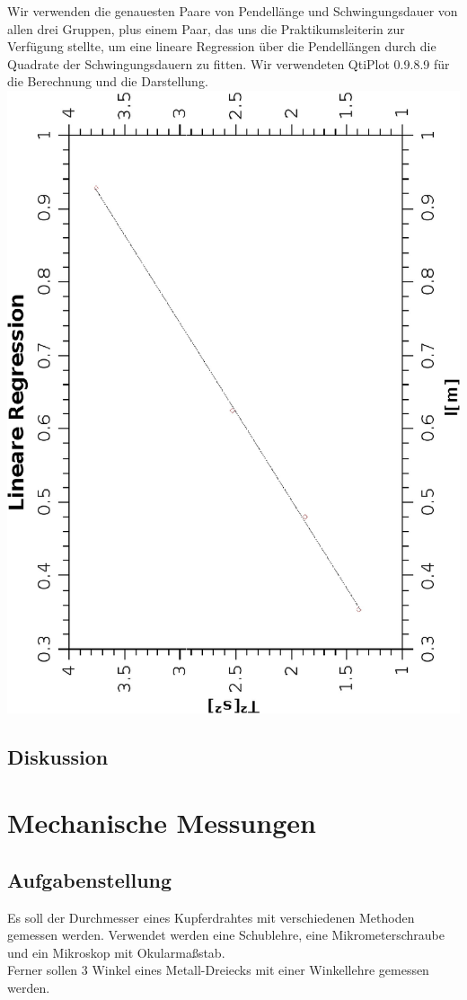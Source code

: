 \documentclass{article}
\begin{document}
Wir verwenden die genauesten Paare von Pendellänge und Schwingungsdauer von allen drei Gruppen, plus einem Paar, das uns die Praktikumsleiterin zur Verfügung stellte, um eine lineare Regression über die Pendellängen durch die Quadrate der Schwingungsdauern zu fitten. Wir verwendeten QtiPlot 0.9.8.9 für die Berechnung und die Darstellung. \\
\includegraphics[scale=0.8,angle=-90]{LinearReg.eps}
\subsection{Diskussion}
\section{Mechanische Messungen}
\subsection{Aufgabenstellung}
Es soll der Durchmesser eines Kupferdrahtes mit verschiedenen Methoden gemessen werden. Verwendet werden eine Schublehre, eine Mikrometerschraube und ein Mikroskop mit Okularmaßstab.\\
Ferner sollen 3 Winkel eines Metall-Dreiecks mit einer Winkellehre gemessen werden.
\end{document}
